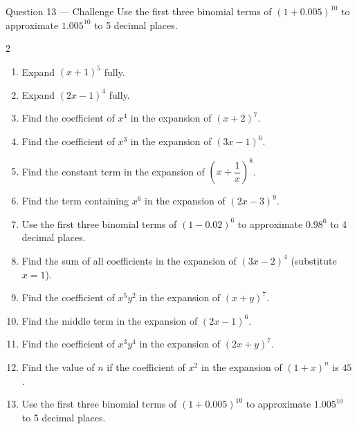 \documentclass[11pt]{article}
\begin{document}
\begin{qbox}{Question 13 --- Challenge}
Use the first three binomial terms of $(1+0.005)^{10}$ to approximate $1.005^{10}$ to 5 decimal places.\workspace{3.4cm}
\end{qbox}

\clearpage
{}

\begin{recapbox}
\begin{multicols}{2}
\small
\begin{enumerate}[leftmargin=*,itemsep=3pt]
  \item Expand $(x+1)^5$ fully.
  \item Expand $(2x-1)^4$ fully.
  \item Find the coefficient of $x^4$ in the expansion of $(x+2)^7$.
  \item Find the coefficient of $x^3$ in the expansion of $(3x-1)^6$.
  \item Find the constant term in the expansion of $\left(x+\dfrac{1}{x}\right)^8$.
  \item Find the term containing $x^6$ in the expansion of $(2x-3)^9$.
  \item Use the first three binomial terms of $(1-0.02)^6$ to approximate $0.98^6$ to 4 decimal places.
  \item Find the sum of all coefficients in the expansion of $(3x-2)^4$ (substitute $x=1$).
  \item Find the coefficient of $x^5y^2$ in the expansion of $(x+y)^7$.
  \item Find the middle term in the expansion of $(2x-1)^6$.
  \item Find the coefficient of $x^3y^4$ in the expansion of $(2x+y)^7$.
  \item Find the value of $n$ if the coefficient of $x^2$ in the expansion of $(1+x)^n$ is $45$.
  \item Use the first three binomial terms of $(1+0.005)^{10}$ to approximate $1.005^{10}$ to 5 decimal places.
\end{enumerate}
\end{multicols}
\end{recapbox}
\end{document}
